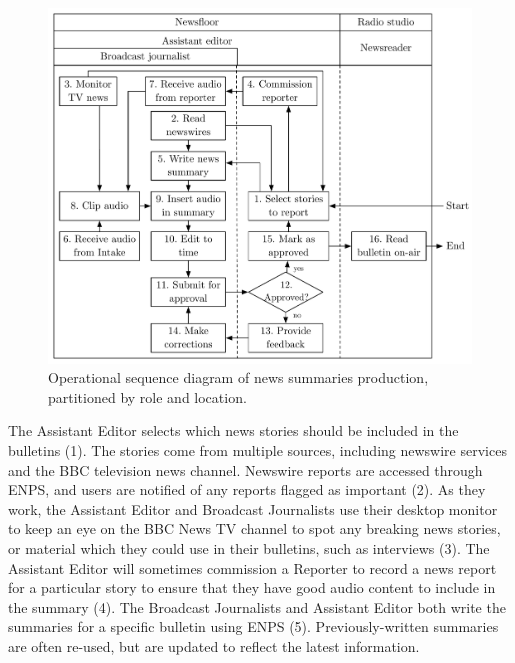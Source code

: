 \begin{figure}[p]
	\centering
	\includegraphics[width=.9\columnwidth]{figs/news-workflow.pdf}
  \caption{Operational sequence diagram of news summaries production, partitioned by role and location.}
	\label{fig:news-flowchart}
\end{figure}

The Assistant Editor selects which news stories should be included in the bulletins (1). The stories come from multiple
sources, including newswire services and the BBC television news channel.  Newswire reports are accessed through ENPS,
and users are notified of any reports flagged as important (2).  As they work, the Assistant Editor and Broadcast
Journalists use their desktop monitor to keep an eye on the BBC News TV channel to spot any breaking news stories, or
material which they could use in their bulletins, such as interviews (3).  The Assistant Editor will sometimes
commission a Reporter to record a news report for a particular story to ensure that they have good audio content to
include in the summary (4). The Broadcast Journalists and Assistant Editor both write the summaries for a specific
bulletin using ENPS (5).  Previously-written summaries are often re-used, but are updated to reflect the latest
information.

